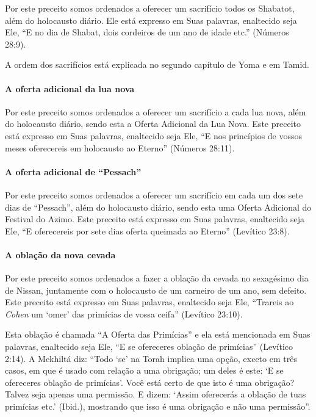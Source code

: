 Por este preceito somos ordenados a oferecer um sacrifício todos os
Shabatot, além do holocausto diário. Ele está expresso em Suas palavras,
enaltecido seja Ele, ``E no dia de Shabat, dois cordeiros de um ano de
idade etc.'' (Números 28:9).

A ordem dos sacrifícios está explicada no segundo capítulo de Yoma e em
Tamid.

\paragraph{A oferta adicional da lua nova}

Por este preceito somos ordenados a oferecer um sacrifício a cada lua
nova, além do holocausto diário, sendo esta a Oferta Adicional da Lua
Nova. Este preceito está expresso em Suas palavras, enaltecido seja
Ele, ``E nos princípios de vossos meses oferecereis em holocausto ao
Eterno'' (Números 28:11).

\paragraph{A oferta adicional de ``Pessach''}

Por este preceito somos ordenados a oferecer um sacrifício em cada um
dos sete dias de ``Pessach'', além do holocausto diário, sendo esta uma
Oferta Adicional do Festival do Azimo. Este preceito está expresso em
Suas palavras, enaltecido seja Ele, ``E oferecereis por sete dias
oferta queimada ao Eterno'' (Levítico 23:8).

\paragraph{A oblação da nova cevada}

Por este preceito somos ordenados a fazer a oblação da cevada no
sexagésimo dia de Nissan, juntamente com o holocausto de um carneiro de
um ano, sem defeito. Este preceito está expresso em Suas palavras,
enaltecido seja Ele, ``Trareis ao \textit{Cohen} um `omer' das primícias de
vossa ceifa'' (Levítico 23:10).

Esta oblação é chamada ``A Oferta das Primícias'' e ela está mencionada
em Suas palavras, enaltecido seja Ele, ``E se ofereceres oblação de
primícias'' (Levítico 2:14). A Mekhiltá diz: ``Todo `se' na Torah
implica uma opção, exceto em três casos, em que é usado com relação a
uma obrigação; um deles é este: `E se ofereceres oblação de primícias'.
Você está certo de que isto é uma obrigação? Talvez seja apenas uma
permissão. E dizem: `Assim oferecerás a oblação de tuas primícias etc.'
(Ibid.), mostrando que isso é uma obrigação e não uma permissão''.

